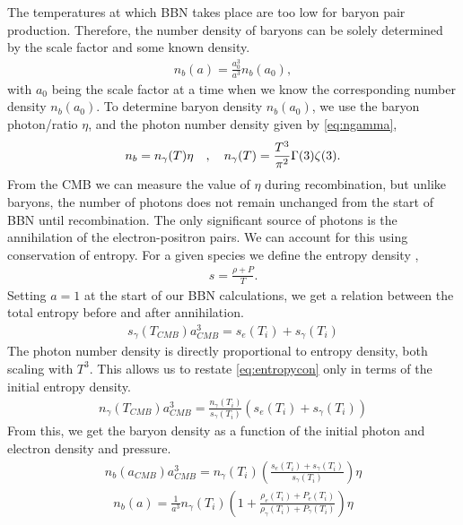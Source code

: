 The temperatures at which BBN takes place are too low for baryon pair production. Therefore, the number density of baryons can be solely determined by the scale factor and some known density. 
\begin{align}
    n_b(a)=\frac{a_0^3}{a^3}n_{b}(a_0),
\end{align}
with $a_0$ being the scale factor at a time when we know the corresponding number density $n_{b}(a_0)$. To determine baryon density $n_{b}(a_0)$, we use the baryon photon/ratio $\eta$, and the photon number density given by \cref{eq:ngamma}, 
\begin{align}
    n_b=n_\gamma(T) \eta \quad , \quad n_\gamma(T)=\frac{T^3}{\pi^2}\Gamma(3)\zeta(3).
\end{align}
From the CMB we can measure the value of $\eta$ during recombination, but unlike baryons, the number of photons does not remain unchanged from the start of BBN until recombination. The only significant source of photons is the annihilation of the electron-positron pairs. We can account for this using conservation of entropy. For a given species we define the entropy density \cite[(3.91)]{kolbturner},
\begin{align}
    s=\frac{\rho+P}{T}.
\end{align}
Setting $a=1$ at the start of our BBN calculations, we get a relation between the total entropy before and after annihilation.
\begin{align}
     s_{\gamma}(T_{CMB})a_{CMB}^3= s_e(T_{i})+s_{\gamma}(T_{i})
    \label{eq:entropycon}
\end{align}
The photon number density is directly proportional to entropy density, both scaling with $T^3$. This allows us to restate \eqref{eq:entropycon} only in terms of the initial entropy density.
\begin{align}
    n_{\gamma}(T_{CMB})a_{CMB}^3 = \frac{n_\gamma(T_{i})}{s_{\gamma}(T_{i})}\left(s_e(T_{i})+s_{\gamma}(T_{i})\right)
\end{align}
From this, we get the baryon density as a function of the initial photon and electron density and pressure.
\begin{align}
    n_b(a_{CMB}){a_{CMB}^3}=n_\gamma(T_{i}) \left(\frac{s_e(T_{i})+s_{\gamma}(T_{i})}{s_{\gamma}(T_{i})}\right)\eta
\end{align}
\begin{align}
    n_b(a)=\frac{1}{a^3}n_\gamma(T_{i}) \left(1+\frac{\rho_e(T_{i})+P_{e}(T_{i})}{\rho_{\gamma}(T_{i})+P_{\gamma}(T_{i})}\right)\eta
    \label{n_b}
\end{align}
